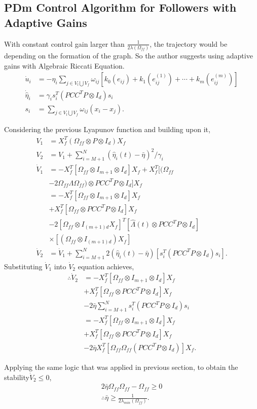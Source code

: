 \subsection{PDm Control Algorithm for Followers with Adaptive Gains} \label{PDm_Control_Algorithm_Followers_with_Adaptive_gains}

 With constant control gain larger than $\frac{1}{2\lambda(\Omega_{ff})}$, the trajectory would be depending on the formation of the graph. So the author suggests using adaptive gains with Algebraic Riccati Equation. 
 \begin{align*}
   \dot u_i &= -\eta_i \sum_{j \in V_l\bigcup V_f } \omega_{ij}[k_0(e_{ij}) + k_1(e_{ij}^{(1)}) + \cdots +k_m(e_{ij}^{(m)})]\\
   \dot {\hat \eta}_i &=\gamma_i s_i^T(PCC^TP \otimes I_d)s_i\\
   s_i &= \sum_{j \in V_l \bigcup V_f} \omega_{ij}(x_i - x_j).
 \end{align*}

 Considering the previous Lyapunov function and building upon it, 
 \begin{align*}
   V_{1} &= X_f^T (\Omega_{ff} \otimes P \otimes I_d) X_f\\
   V_{2} &= V_{1} + \sum_{i = M+1}^{N}(\hat \eta_i(t) - \bar \eta)^2/\gamma_i\\
   \dot V_{1} &= - X_f^T [\Omega_{ff}\otimes I_{m+1} \otimes I_d] X_f + X_f^T [(\Omega_{ff} \\
   &- 2\Omega_{ff}\Lambda\Omega_{ff})\otimes PCC^TP \otimes I_d]X_f\\
   &=- X_f^T [\Omega_{ff}\otimes I_{m+1} \otimes I_d] X_f \\
   &+X_f^T [\Omega_{ff}\otimes PCC^TP \otimes I_d]X_f\\
   &- 2[\Omega_{ff}\otimes I_{(m+1)d}X_f]^T[\hat \Lambda(t) \otimes PCC^TP \otimes I_d]\\
   &\times [(\Omega_{ff}\otimes I_{(m+1)d})X_f]\\
   \dot V_{2} &= \dot V_{1} + \sum_{i = M+1}^{N} 2(\hat \eta_i(t) - \bar \eta)[s_i^T(PCC^TP \otimes I_d)s_i].
 \end{align*}
 Substituting $\dot V_1$ into $\dot V_2$ equation achieves, 
 \begin{align*}
   \therefore \dot V_{2} &=- X_f^T [\Omega_{ff}\otimes I_{m+1} \otimes I_d] X_f\\
   & + X_f^T [\Omega_{ff}\otimes PCC^TP \otimes I_d]X_f\\
   & - 2\bar \eta \sum_{i = M+1}^{N} s_i^T(PCC^TP \otimes I_d)s_i\\
   &=- X_f^T [\Omega_{ff}\otimes I_{m+1} \otimes I_d] X_f\\
   & + X_f^T [\Omega_{ff}\otimes PCC^TP \otimes I_d]X_f\\
   & - 2\bar \eta X_f^T[\Omega_{ff}\Omega_{ff}(PCC^TP \otimes I_d)]X_f.
 \end{align*}
 
 Applying the same logic that was applied in previous section, to obtain the stability$\dot V_{2} \leq 0$,
 \begin{align*}
   2\bar \eta \Omega_{ff}\Omega_{ff} - \Omega_{ff} \geq 0\\
   \therefore \bar \eta \geq \frac{1}{2\lambda_{min}(\Omega_{ff})}.
 \end{align*}
 